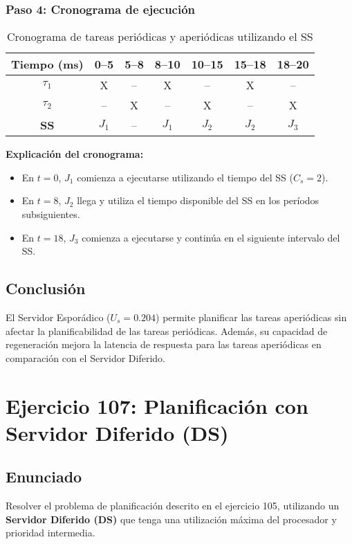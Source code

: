 \documentclass[a4paper,12pt]{article}
\begin{document}
\subsubsection{Paso 4: Cronograma de ejecución}
\begin{table}[H]
\centering
\begin{tabular}{|c|c|c|c|c|c|c|}
\hline
\textbf{Tiempo (ms)} & 0--5 & 5--8 & 8--10 & 10--15 & 15--18 & 18--20 \\ \hline
\textbf{\(\tau_1\)} & X & -- & X & -- & X & -- \\ \hline
\textbf{\(\tau_2\)} & -- & X & -- & X & -- & X \\ \hline
\textbf{SS} & \(J_1\) & -- & \(J_1\) & \(J_2\) & \(J_2\) & \(J_3\) \\ \hline
\end{tabular}
\caption{Cronograma de tareas periódicas y aperiódicas utilizando el SS}
\end{table}

\textbf{Explicación del cronograma:}
\begin{itemize}
    \item En \(t = 0\), \(J_1\) comienza a ejecutarse utilizando el tiempo del SS (\(C_s = 2\)).
    \item En \(t = 8\), \(J_2\) llega y utiliza el tiempo disponible del SS en los períodos subsiguientes.
    \item En \(t = 18\), \(J_3\) comienza a ejecutarse y continúa en el siguiente intervalo del SS.
\end{itemize}

\subsection{Conclusión}
El Servidor Esporádico (\(U_s = 0.204\)) permite planificar las tareas aperiódicas sin afectar la planificabilidad de las tareas periódicas. Además, su capacidad de regeneración mejora la latencia de respuesta para las tareas aperiódicas en comparación con el Servidor Diferido.

\section{Ejercicio 107: Planificación con Servidor Diferido (DS)}
\subsection{Enunciado}
Resolver el problema de planificación descrito en el ejercicio 105, utilizando un \textbf{Servidor Diferido (DS)} que tenga una utilización máxima del procesador y prioridad intermedia.
\end{document}

